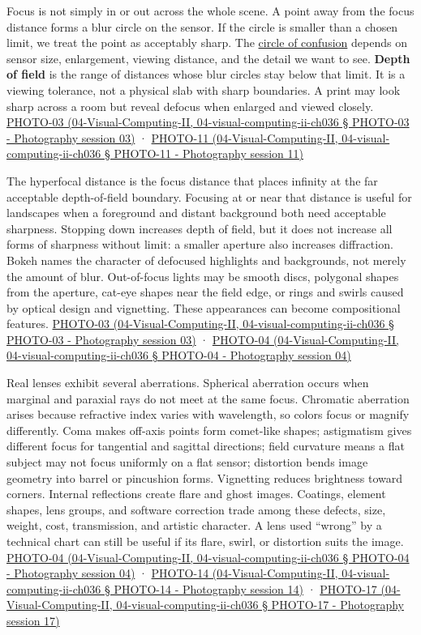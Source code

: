 Focus is not simply in or out across the whole scene. A point away from the focus distance forms a blur circle on the sensor. If the circle is smaller than a chosen limit, we treat the point as acceptably sharp. The \hyperref[appendix-21f8456e2629]{circle of confusion} depends on sensor size, enlargement, viewing distance, and the detail we want to see. \textbf{Depth of field} is the range of distances whose blur circles stay below that limit. It is a viewing tolerance, not a physical slab with sharp boundaries. A print may look sharp across a room but reveal defocus when enlarged and viewed closely. \href{}{PHOTO-03 (04-Visual-Computing-II, 04-visual-computing-ii-ch036 § PHOTO-03 - Photography session 03)} · \href{}{PHOTO-11 (04-Visual-Computing-II, 04-visual-computing-ii-ch036 § PHOTO-11 - Photography session 11)}

The hyperfocal distance is the focus distance that places infinity at the far acceptable depth-of-field boundary. Focusing at or near that distance is useful for landscapes when a foreground and distant background both need acceptable sharpness. Stopping down increases depth of field, but it does not increase all forms of sharpness without limit: a smaller aperture also increases diffraction. Bokeh names the character of defocused highlights and backgrounds, not merely the amount of blur. Out-of-focus lights may be smooth discs, polygonal shapes from the aperture, cat-eye shapes near the field edge, or rings and swirls caused by optical design and vignetting. These appearances can become compositional features. \href{}{PHOTO-03 (04-Visual-Computing-II, 04-visual-computing-ii-ch036 § PHOTO-03 - Photography session 03)} · \href{}{PHOTO-04 (04-Visual-Computing-II, 04-visual-computing-ii-ch036 § PHOTO-04 - Photography session 04)}

Real lenses exhibit several aberrations. Spherical aberration occurs when marginal and paraxial rays do not meet at the same focus. Chromatic aberration arises because refractive index varies with wavelength, so colors focus or magnify differently. Coma makes off-axis points form comet-like shapes; astigmatism gives different focus for tangential and sagittal directions; field curvature means a flat subject may not focus uniformly on a flat sensor; distortion bends image geometry into barrel or pincushion forms. Vignetting reduces brightness toward corners. Internal reflections create flare and ghost images. Coatings, element shapes, lens groups, and software correction trade among these defects, size, weight, cost, transmission, and artistic character. A lens used ``wrong'' by a technical chart can still be useful if its flare, swirl, or distortion suits the image. \href{}{PHOTO-04 (04-Visual-Computing-II, 04-visual-computing-ii-ch036 § PHOTO-04 - Photography session 04)} · \href{}{PHOTO-14 (04-Visual-Computing-II, 04-visual-computing-ii-ch036 § PHOTO-14 - Photography session 14)} · \href{}{PHOTO-17 (04-Visual-Computing-II, 04-visual-computing-ii-ch036 § PHOTO-17 - Photography session 17)}

